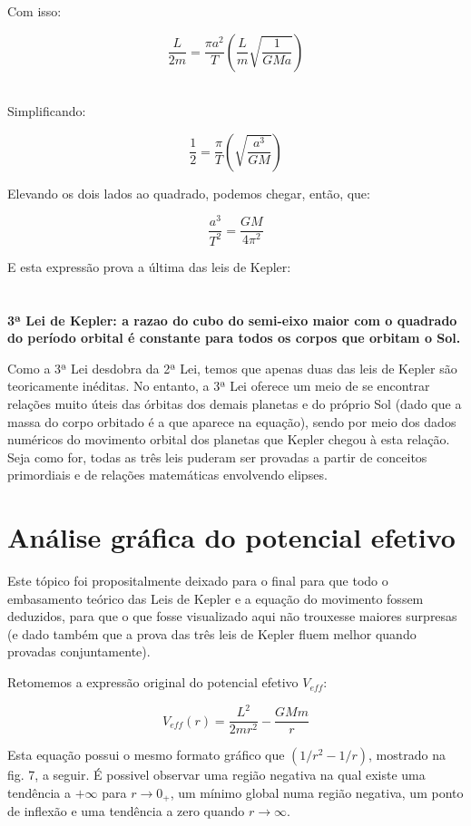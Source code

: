 Com isso:

\[
	\frac{L}{2m} = \frac{\pi a^2}{T}\left(\frac{L}{m}\sqrt{\frac{1}{GMa}}\right)
\]{\\}

Simplificando:

\[
	\frac{1}{2} = \frac{\pi}{T}\left(\sqrt{\frac{a^3}{GM}}\right)
\]

Elevando os dois lados ao quadrado, podemos chegar, então, que:

\begin{equation}
	\frac{a^3}{T^2} = \frac{GM}{4\pi^2} \label{eq60}
\end{equation}

E esta expressão prova a última das leis de Kepler:{\\}{\\}{\\}
\textbf{\Large{3ª Lei de Kepler: a razao do cubo do semi-eixo maior com o quadrado do período orbital é constante para todos os corpos que orbitam o Sol.}} {\\}

Como a 3ª Lei desdobra da 2ª Lei, temos que apenas duas das leis de Kepler são teoricamente inéditas. No entanto, a 3ª Lei oferece um meio de se encontrar relações muito úteis das órbitas dos demais planetas e do próprio Sol (dado que a massa do corpo orbitado é a que aparece na equação), sendo por meio dos dados numéricos do movimento orbital dos planetas que Kepler chegou à esta relação. Seja como for, todas as três leis puderam ser provadas a partir de conceitos primordiais e de relações matemáticas envolvendo elipses.

\section{Análise gráfica do potencial efetivo}

Este tópico foi propositalmente deixado para o final para que todo o embasamento teórico das Leis de Kepler e a equação do movimento fossem deduzidos, para que o que fosse visualizado aqui não trouxesse maiores surpresas (e dado também que a prova das três leis de Kepler fluem melhor quando provadas conjuntamente).{\\}

Retomemos a expressão original do potencial efetivo $V_{eff}$:

\[
	V_{eff}(r) = \frac{L^2}{2mr^2} - \frac{GMm}{r} 
\]

Esta equação possui o mesmo formato gráfico que $(1/r^2 - 1/r)$, mostrado na fig. 7, a seguir. É possivel observar uma região negativa na qual existe uma tendência a $+\infty$ para $r \rightarrow 0_+$, um mínimo global numa região negativa, um ponto de inflexão e uma tendência a zero quando $r \rightarrow \infty$.

